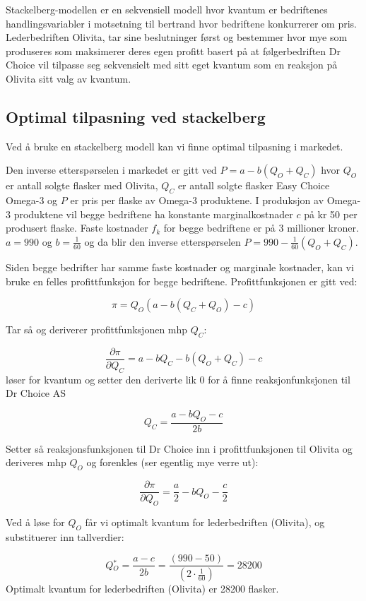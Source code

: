 \documentclass[
  12pt,
  a4paper,
  DIV=11,
  numbers=noendperiod]{scrartcl}
\begin{document}
Stackelberg-modellen er en sekvensiell modell hvor kvantum er
bedriftenes handlingsvariabler i motsetning til bertrand hvor bedriftene
konkurrerer om pris. Lederbedriften Olivita, tar sine beslutninger først
og bestemmer hvor mye som produseres som maksimerer deres egen profitt
basert på at følgerbedriften Dr Choice vil tilpasse seg sekvensielt med
sitt eget kvantum som en reaksjon på Olivita sitt valg av kvantum.

\subsection{Optimal tilpasning ved
stackelberg}\label{optimal-tilpasning-ved-stackelberg}

Ved å bruke en stackelberg modell kan vi finne optimal tilpasning i
markedet.

Den inverse etterspørselen i markedet er gitt ved \(P = a−b(Q_O+Q_C)\)
hvor \(Q_O\) er antall solgte flasker med Olivita, \(Q_C\) er antall
solgte flasker Easy Choice Omega-3 og \(P\) er pris per flaske av
Omega-3 produktene. I produksjon av Omega-3 produktene vil begge
bedriftene ha konstante marginalkostnader \(c\) på kr 50 per produsert
flaske. Faste kostnader \(f_k\) for begge bedriftene er på 3 millioner
kroner. \(a = 990\) og \(b = \frac{1}{60}\) og da blir den inverse
etterspørselen \(P = 990−\frac{1}{60}(Q_O+Q_C)\).

Siden begge bedrifter har samme faste kostnader og marginale kostnader,
kan vi bruke en felles profittfunksjon for begge bedriftene.
Profittfunksjonen er gitt ved:

\[\pi = Q_O(a-b(Q_C+Q_O)-c) \tag{1}\]

Tar så og deriverer profittfunksjonen mhp \(Q_C\):

\[\frac{\partial \pi}{\partial Q_C} = a -b Q_C - b(Q_O+Q_C) -c \tag{2}\]
løser for kvantum og setter den deriverte lik 0 for å finne
reaksjonfunksjonen til Dr Choice AS

\[ Q_C = \frac{a-b Q_O -c}{2b} \tag{3}\]

Setter så reaksjonsfunksjonen til Dr Choice inn i profittfunksjonen til
Olivita og deriveres mhp \(Q_O\) og forenkles (ser egentlig mye verre
ut):

\[\frac{\partial \pi}{\partial Q_O} = \frac{a}{2}-bQ_O - \frac{c}{2} \tag{4}\]

Ved å løse for \(Q_O\) får vi optimalt kvantum for lederbedriften
(Olivita), og substituerer inn tallverdier:

\[Q{_O^*} = \frac{a-c}{2b} = \frac{(990 - 50)}{(2 \cdot \frac{1}{60})}  = 28200 \tag{5}\]
Optimalt kvantum for lederbedriften (Olivita) er 28200 flasker.
\end{document}
